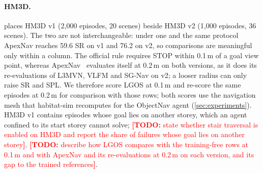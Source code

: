 \documentclass[10pt]{article}
\newcommand{\TODO}[1]{\textcolor{red}{\textbf{[TODO:} #1\textbf{]}}}
\newcommand{\ours}{LGOS\xspace}
\newcommand{\SR}{\textsc{SR}\xspace}
\newcommand{\SPL}{\textsc{SPL}\xspace}
\begin{document}
\paragraph{HM3D.}
 places HM3D v1 (2{,}000 episodes, 20 scenes) beside HM3D v2 (1{,}000 episodes, 36 scenes). The two
are not interchangeable: under one and the same protocol ApexNav reaches 59.6 \SR on v1 and 76.2 on v2, so
comparisons are meaningful only within a column. The official rule requires STOP within 0.1\,m of a goal view point,
whereas ApexNav~\citep{zhang2025apexnav} evaluates itself at 0.2\,m on both versions, as it does its re-evaluations of
L3MVN, VLFM and SG-Nav on v2; a looser radius can only raise \SR and \SPL. We therefore score \ours at 0.1\,m and
re-score the same episodes at 0.2\,m for comparison with those rows; both scores use the navigation mesh that habitat-sim recomputes for
the ObjectNav agent (\cref{sec:experiments}). HM3D v1 contains episodes whose goal lies on another storey, which an
agent confined to its start storey cannot solve; \TODO{state whether stair traversal is enabled on HM3D and report
the share of failures whose goal lies on another storey}. \TODO{describe how \ours compares with the training-free
rows at 0.1\,m and with ApexNav and its re-evaluations at 0.2\,m on each version, and its gap to the trained
references}.
\end{document}
